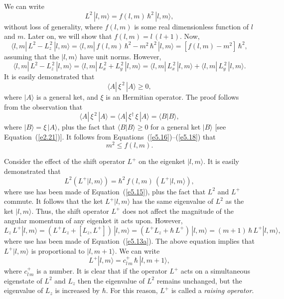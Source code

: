 We can write
\begin{equation}\label{e5.15}
L^2 \,|l, m\rangle = f(l,m)\, \hbar^2\,|l, m\rangle,
\end{equation}
without loss of generality, 
where $f(l,m)$ is some real dimensionless function of $l$ and $m$. Later on,
we will show that $f(l,m) = l\,(l+1)$. 
Now, 
\begin{equation}\label{e5.16}
\langle l, m |\, L^2 - L_z^{\,2}\, |l, m\rangle =\langle l, m|\,
f(l, m) \,\hbar^2 - m^2\, \hbar^2\, |l, m\rangle =[f(l,m) - m^2] \,\hbar^2,
\end{equation}
assuming that the $|l, m\rangle$ have unit norms. However,
\begin{equation}
\langle l, m |\,L^2 - L_z^{\,2}\,|l, m\rangle =\langle l, m|\,
L_x^{\,2} + L_y^{\,2}\,|l, m\rangle = \langle l, m|\,L_x^{\,2}\,|l, m\rangle+
\langle l, m|\,L_y^{\,2}\,|l, m\rangle.
\end{equation}
It is easily demonstrated that
\begin{equation}\label{e5.18}
\langle A|\,\xi^{\,2}\,|A\rangle\geq 0,
\end{equation}
where $|A\rangle$ is a general  ket, and $\xi$ is an Hermitian operator. 
The proof follows from the observation that 
\begin{equation}
\langle A|\,\xi^{\,2}\,|A\rangle
= \langle A|\,\xi^{\dag}\, \xi\,|A\rangle = \langle B| B\rangle, 
\end{equation}
where $|B\rangle = \xi\, |A\rangle$, plus the fact that $\langle B|B\rangle\geq 0$
for a general  ket $|B\rangle$ [see Equation~(\ref{e2.21})]. It follows from
Equations~(\ref{e5.16})--(\ref{e5.18}) that
\begin{equation}\label{e5.20}
m^2 \leq f(l,m).
\end{equation}

Consider the effect of the shift operator $L^+$ on the eigenket $|l, m\rangle$.
It is easily demonstrated that
\begin{equation}
L^2 (L^+ |l, m\rangle) = \hbar^2\, f(l,m)\, (L^+ |l,m\rangle),
\end{equation}
where use has been made of Equation~(\ref{e5.15}), plus
the fact that $L^2$ and $L^+$ commute. 
It follows that the ket $L^+ |l,m\rangle$ has the same
eigenvalue of $L^2$ as the ket $|l,m\rangle$. Thus, the shift operator
$L^+$ does not affect the magnitude of the angular momentum of 
any eigenket it acts upon. However, 
\begin{equation}
L_z \,L^+ |l, m\rangle = (L^+ L_z + [L_z, L^+])\,|l,m\rangle
= (L^+ L_z + \hbar\, L^+) \,|l,m\rangle
= (m+1)\,\hbar \,L^+|l, m\rangle,
\end{equation}
where use has been made of Equation~(\ref{e5.13a}). The above equation implies
that $L^+ |l,m\rangle$ is proportional to $|l, m+1\rangle$. We can
write
\begin{equation}\label{e5.23}
L^+ |l ,m\rangle = c^+_{l\,m}\, \hbar\,|l, m+1\rangle,
\end{equation}
where $c^+_{l\, m}$ is a number. It is clear that if the operator $L^+$ 
acts on a simultaneous  eigenstate of $L^2$ and $L_z$ then 
the eigenvalue of $L^2$ remains unchanged, but the  eigenvalue
of $L_z$ is increased by $\hbar$. For this reason, $L^+$  is called
a {\em raising operator}. 

